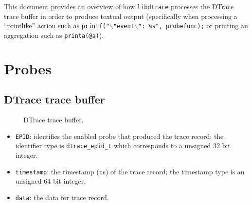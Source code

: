 This document provides an overview of how \texttt{libdtrace} processes the
DTrace trace buffer in order to produce textual output (specifically when
processing a ``printlike'' action such as
\texttt{printf("$\backslash$"event$\backslash$": \%s", probefunc);} or
printing an aggregation such as \texttt{printa(@a)}). 

\section{Probes}
\label{sec:probes}

\subsection{DTrace trace buffer}
\label{subsec:trace_buffer}

\begin{figure}[!ht]
	\centering
	\caption{DTrace trace buffer.}
	\label{fig:trace_buffer}
\end{figure}

\begin{itemize}
	\item{\texttt{EPID}}: identifies the enabled probe that produced the
trace record; the identifier type is \texttt{dtrace\_epid\_t} which corresponds
to a unsigned 32 bit integer.

	\item{\texttt{timestamp}:} the timestamp (ns) of the trace record; the
timestamp type is an unsigned 64 bit integer.

	\item{\texttt{data}:} the data for trace record.
\end{itemize}

